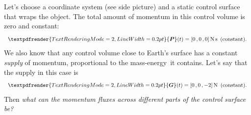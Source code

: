 \documentclass[a4paper,12pt,%
onecolumn,oneside,%
british%
]{memoir}
\renewcommand*{\bm}[1]{\textpdfrender{TextRenderingMode=2,LineWidth=0.2pt}{\boldsymbol{#1}}}
\renewcommand*{\|}[1][]{\nonscript\:#1\vert\nonscript\:\mathopen{}}
\newcommand*{\sect}{\S}%
\renewcommand*{\autoref}[3][\sect\,\ref]{\textcolor{blue}{#3}
\raisebox{0.6ex}{\color{blue}\miniscule%
\faIcon{angle-right}%
\;#1{#2}\;p.\,\pageref{#2}}}
\newcommand*{\masse}{mass-energy}
\newcommand*{\yP}{\bm{P}}
\newcommand*{\yG}{\bm{G}}
\begin{document}
Let's choose a coordinate system (see side picture) and a static control surface that wraps the object. The total amount of momentum in this control volume is zero and constant:
%
%
\begin{equation*}
  \yP(t) = [0\,,0\,,0]\,\unit{N\,s}\enskip\text{(constant)}.
\end{equation*}
We also know that any control volume close to Earth's surface %
has a constant \emph{supply} of momentum, proportional to the \masse\ it contains. Let's say that the supply in this case is
\begin{equation*}
  \yG(t) = [0\,,0\,,\num{-2}]\,\unit{N}\enskip\text{(constant)}.
\end{equation*}
Then \emph{what can the momentum fluxes across different parts of the control surface be?}
\end{document}
